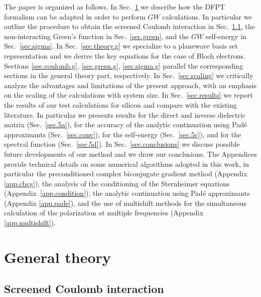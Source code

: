 \documentclass[twocolumn,prb,showpacs,superscriptaddress]{revtex4}
\begin{document}
The paper is organized as follows. In Sec.\ \ref{sec.theory} we describe
how the DFPT formalism can be adapted in order to perform $GW$ calculations.
In particular we outline the procedure to obtain the screened Coulomb
interaction in Sec.\ \ref{sec.coulomb}, the non-interacting Green's function
in Sec.\ \ref{sec.green}, and the $GW$ self-energy in Sec.\ \ref{sec.sigma}.
In Sec.\ \ref{sec.theory.g} we specialize to a planewave basis set representation
and we derive the key equations for the case of Bloch electrons.
Sections \ref{sec.coulomb.g}, \ref{sec.green.g}, \ref{sec.sigma.g}
parallel the corresponding sections in the general theory part, respectively.
In Sec.\ \ref{sec.scaling} we critically analyze the advantages 
and limitations of the present approach, with an emphasis on the
scaling of the calculations with system size. 
In Sec.\ \ref{sec.results} we report the results of our test calculations
for silicon and compare with the existing literature. In particular
we presents results for the direct and inverse dielectric matrix (Sec.\ \ref{sec.5a}),
for the accuracy of the analytic continuation using Pad\'e approximants
(Sec.\ \ref{sec.conv}), for the self-energy (Sec.\ \ref{sec.5c}), 
and for the spectral function (Sec.\ \ref{sec.5d}).
In Sec.\ \ref{sec.conclusions} we discuss possible
future developments of our method and we draw our conclusions.
The Appendices provide technical details on some numerical algorithms adopted
in this work, in particular the preconditioned complex biconjugate gradient method (Appendix \ref{app.cbcg}),
the analysis of the conditioning of the Sternheimer equations (Appendix~\ref{app.condition}),
the analytic continuation using Pad\'e approximants (Appendix \ref{app.pade}),
and the use of multishift methods for the simultaneous calculation of 
the polarization at multiple frequencies (Appendix \ref{app.multishift}).

\section{General theory}\label{sec.theory}

\subsection{Screened Coulomb interaction}\label{sec.coulomb}
\end{document}
